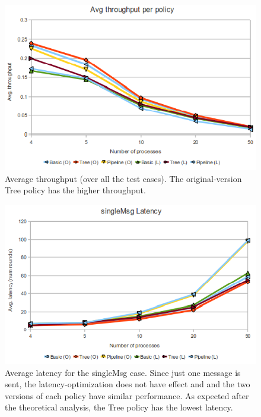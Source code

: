 \documentclass[a4paper, 11pt]{article}
\begin{document}
\begin{figure}[htp]
  \centering
  \includegraphics[scale=0.6]{avgTpPerPolicy.png}
	\caption{Average throughput (over all the test cases). The original-version Tree policy has the higher throughput.}
  \label{fig:avgTpPerPolicy}
\end{figure}


\begin{figure}[htp]
  \centering
  \includegraphics[scale=0.6]{avgLatSingleMsg.png}
	\caption{Average latency for the singleMsg case. Since just one message is sent, the latency-optimization does not have effect and and the two versions of each policy have similar performance. As expected after the theoretical analysis, the Tree policy has the lowest latency.}
  \label{fig:avgLatSingleMsg}
\end{figure}
\end{document}
